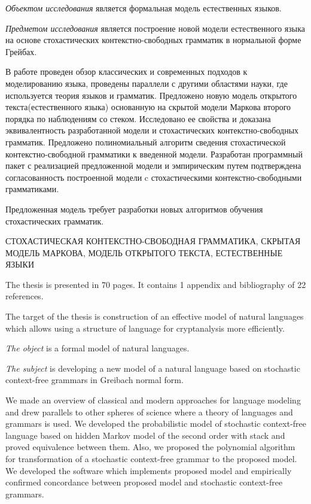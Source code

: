 \textit{Объектом исследования} является формальная модель естественных языков.

\textit{Предметом исследования} является построение новой модели естественного языка на основе стохастических контекстно-свободных грамматик в нормальной форме Грейбах.

В работе проведен обзор классических и современных подходов к моделированию языка, проведены параллели с другими областями науки, где используется теория языков и грамматик. Предложено новую модель открытого текста(естественного языка) основанную на скрытой модели Маркова второго порядка по наблюдениям со стеком. Исследовано ее свойства и доказана эквивалентность разработанной модели и стохастических контекстно-свободных грамматик. Предложено полиномиальный алгоритм сведения стохастической контекстно-свободной грамматики к введенной модели. Разработан программный пакет с реализацией предложенной модели и эмпирическим путем подтверждена согласованность построенной модели c стохастическими контекстно-свободными грамматиками.

Предложенная модель требует разработки новых алгоритмов обучения стохастических грамматик.

\MakeUppercase{стохастическая контекстно-свободная грамматика, скрытая модель Маркова, модель открытого текста, естественные языки}

\abstractEng

The thesis is presented in 70 pages. It contains 1 appendix and bibliography of 22 references.

The target of the thesis is construction of an effective model of natural languages which allows using a structure of language for cryptanalysis more efficiently.

\textit{The object} is a formal model of natural languages.

\textit{The subject} is developing a new model of a natural language based on stochastic context-free grammars in Greibach normal form.

We made an overview of classical and modern approaches for language modeling and drew parallels to other spheres of science where a theory of languages and grammars is used. We developed the probabilistic model of stochastic context-free language based on hidden Markov model of the second order with stack and proved equivalence between them. Also, we proposed the polynomial algorithm for transformation of a stochastic context-free grammar to the proposed model. We developed the software which implements proposed model and empirically confirmed concordance between proposed model and stochastic context-free grammars.

